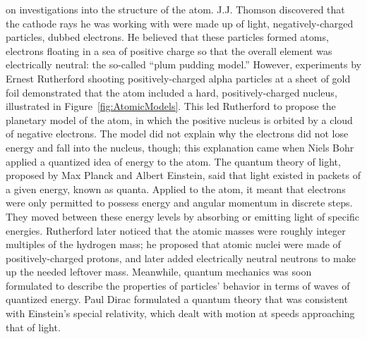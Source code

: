 on investigations into the structure of the atom.  
J.J. Thomson discovered that the cathode rays 
he was working with were 
made up of light, negatively-charged particles, 
dubbed electrons.  
He believed that these particles formed atoms, 
electrons floating in a sea of positive charge 
so that the overall element was electrically neutral: %
the so-called ``plum pudding model.''  
However, experiments by Ernest Rutherford 
shooting positively-charged 
alpha particles at a sheet of gold foil demonstrated 
that the atom included a hard, positively-charged nucleus, 
illustrated in Figure~\ref{fig:AtomicModels}.  
This led 
Rutherford to propose the 
planetary model of the atom, in which the positive nucleus 
is orbited by a cloud of negative electrons.  
The model did not explain why the electrons did not 
lose energy and fall into the nucleus, though; 
this explanation came when Niels Bohr applied a 
quantized idea of energy to the atom.  
The quantum theory of light, 
proposed by Max Planck and Albert Einstein, 
said that light existed in packets of a given energy, 
known as quanta. 
Applied to the atom, it meant that 
electrons were only permitted to possess 
energy and angular momentum in discrete steps.  
They moved between these energy levels by absorbing 
or emitting light of specific energies.  
Rutherford later noticed that the atomic masses 
were roughly integer multiples of the hydrogen mass; 
he proposed that atomic nuclei were made of 
positively-charged protons, 
and later added electrically neutral neutrons 
to make up the needed leftover mass.  
Meanwhile, quantum mechanics was soon formulated to describe 
the properties of particles' behavior in terms of waves 
of quantized energy.  
Paul Dirac formulated a quantum theory that was consistent 
with Einstein's special relativity, 
which dealt with motion at speeds approaching that of light.  
